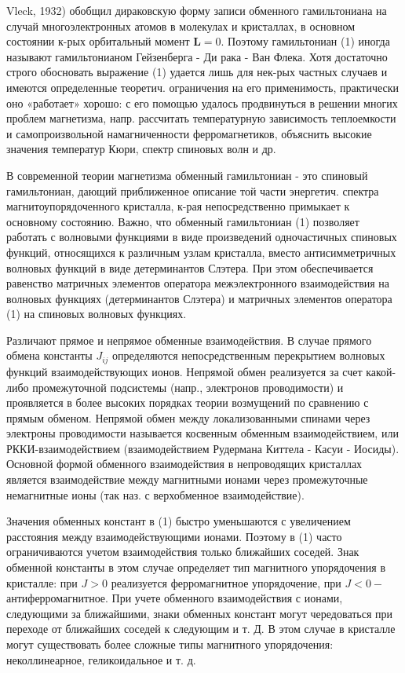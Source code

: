 \documentclass[10pt]{article}
\begin{document}
Vleck, 1932) обобщил дираковскую форму записи обменного гамильтониана на случай многоэлектронных атомов в молекулах и кристаллах, в основном состоянии к-рых орбитальный момент $\boldsymbol{L}=0$. Поэтому гамильтониан (1) иногда называют гамильтонианом Гейзенберга - Ди рака - Ван Флека. Хотя достаточно строго обосновать выражение (1) удается лишь для нек-рых частных случаев и имеются определенные теоретич. ограничения на его применимость, практически оно «работает» хорошо: с его помощью удалось продвинуться в решении многих проблем магнетизма, напр. рассчитать температурную зависимость теплоемкости и самопроизвольной намагниченности ферромагнетиков, объяснить высокие значения температур Кюри, спектр спиновых волн и др.



В современной теории магнетизма обменный гамильтониан - это спиновый гамильтониан, дающий приближенное описание той части энергетич. спектра магнитоупорядоченного кристалла, к-рая непосредственно примыкает к основному состоянию. Важно, что обменный гамильтониан (1) позволяет работать с волновыми функциями в виде произведений одночастичных спиновых функций, относящихся к различным узлам кристалла, вместо антисимметричных волновых функций в виде детерминантов Слэтера. При этом обеспечивается равенство матричных элементов оператора межэлектронного взаимодействия на волновых функциях (детерминантов Слэтера) и матричных элементов оператора (1) на спиновых волновых функциях.



Различают прямое и непрямое обменные взаимодействия. В случае прямого обмена константы $J_{i j}$ определяются непосредственным перекрытием волновых функций взаимодействующих ионов. Непрямой обмен реализуется за счет какой-либо промежуточной подсистемы (напр., электронов проводимости) и проявляется в более высоких порядках теории возмущений по сравнению с прямым обменом. Непрямой обмен между локализованными спинами через электроны проводимости называется косвенным обменным взаимодействием, или РККИ-взаимодействием (взаимодействием Рудермана Киттела - Касуи - Иосиды). Основной формой обменного взаимодействия в непроводящих кристаллах является взаимодействие между магнитными ионами через промежуточные немагнитные ионы (так наз. с верхобменное взаимодействие).



Значения обменных констант в (1) быстро уменьшаются с увеличением расстояния между взаимодействующими ионами. Поэтому в (1) часто ограничиваются учетом взаимодействия только ближайших соседей. Знак обменной константы в этом случае определяет тип магнитного упорядочения в кристалле: при $J>0$ реализуется ферромагнитное упорядочение, при $J<0-$ антиферромагнитное. При учете обменного взаимодействия с ионами, следующими за ближайшими, знаки обменных констант могут чередоваться при переходе от ближайших соседей к следующим и т. Д. В этом случае в кристалле могут существовать более сложные типы магнитного упорядочения: неколлинеарное, геликоидальное и т. д.
\end{document}
